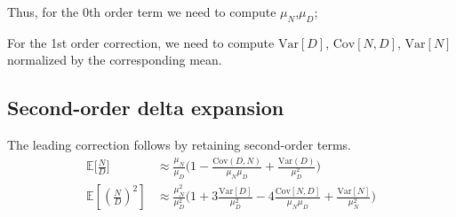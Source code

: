 \noindent{}

Thus, for the 0th order term we need to compute $\mu_{N}$,$\mu_{D}$;

For the 1st order correction, we need to compute $\mathrm{Var}[D]$,
$\mathrm{Cov}[N,D]$, $\mathrm{Var}[N]$ normalized by the corresponding
mean.



\subsection{Second-order delta expansion}
\label{sec:app-ratio-delta}

The leading correction follows by retaining second-order terms.
\begin{align*}
\mathbb{E}\big[\frac{N}{D}\big] & \approx\frac{\mu_{N}}{\mu_{D}}\Big(1-\frac{\mathrm{Cov}(D,N)}{\mu_{N}\mu_{D}}+\frac{\mathrm{Var}(D)}{\mu_{D}^{2}}\Big)\\
\mathbb{E}[(\frac{N}{D})^{2}] & \approx\frac{\mu_{N}^{2}}{\mu_{D}^{2}}\Big(1+3\frac{\mathrm{Var}[D]}{\mu_{D}^{2}}-4\frac{\mathrm{Cov}[N,D]}{\mu_{N}\mu_{D}}+\frac{\mathrm{Var}[N]}{\mu_{N}^{2}}\Big)
\end{align*}


